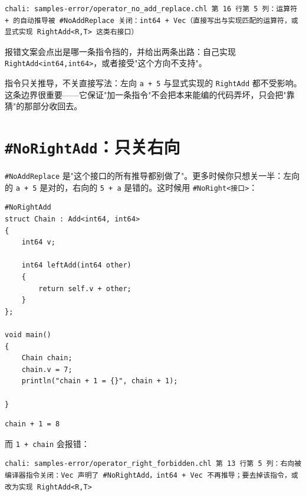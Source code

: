 \par
\medskip
\begin{lstlisting}[style=out]
chali: samples-error/operator_no_add_replace.chl 第 16 行第 5 列：运算符 + 的自动推导被 #NoAddReplace 关闭：int64 + Vec（直接写出与实现匹配的运算符，或显式实现 RightAdd<R,T> 这类右接口）
\end{lstlisting}
\par
\medskip

报错文案会点出是哪一条指令挡的，并给出两条出路：自己实现 \texttt{Right\allowbreak{}Add<\allowbreak{}int64,\allowbreak{}int64>\allowbreak{}}，或者接受"这个方向不支持"。

指令只关推导，不关直接写法：左向 \texttt{a + 5} 与显式实现的 \texttt{Right\allowbreak{}Add} 都不受影响。这条边界很重要——它保证"加一条指令"不会把本来能编的代码弄坏，只会把"靠猜"的那部分收回去。

\section{\texttt{\#No\allowbreak{}Right\allowbreak{}Add}：只关右向}

\texttt{\#No\allowbreak{}Add\allowbreak{}Replace} 是"这个接口的所有推导都别做了"。更多时候你只想关一半：左向的 \texttt{a + 5} 是对的，右向的 \texttt{5 + a} 是错的。这时候用 \texttt{\#No\allowbreak{}Right<\allowbreak{}接口>\allowbreak{}}：

\par
\medskip
\begin{lstlisting}[style=chali]
#NoRightAdd
struct Chain : Add<int64, int64>
{
    int64 v;

    int64 leftAdd(int64 other)
    {
        return self.v + other;
    }
};

void main()
{
    Chain chain;
    chain.v = 7;
    println("chain + 1 = {}", chain + 1);

}
\end{lstlisting}
\par
\medskip

\par
\medskip
\begin{lstlisting}[style=out]
chain + 1 = 8
\end{lstlisting}
\par
\medskip

而 \texttt{1 + chain} 会报错：

\par
\medskip
\begin{lstlisting}[style=out]
chali: samples-error/operator_right_forbidden.chl 第 13 行第 5 列：右向被编译器指令关闭：Vec 声明了 #NoRightAdd，int64 + Vec 不再推导；要去掉该指令，或改为实现 RightAdd<R,T>
\end{lstlisting}
\par
\medskip

